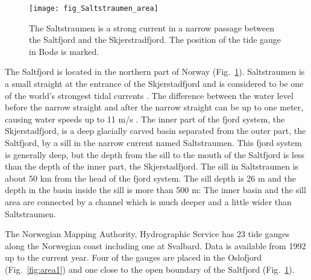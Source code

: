 \begin{figure}[!t]
\centering
\texttt{[image: fig\_Saltstraumen\_area]}
\caption{The Saltstraumen is a strong current in a narrow passage between the Saltfjord and the Skjerstradfjord. The position of the tide gauge in Bod{\o} is marked.}
\label{fig:area2}
\end{figure}

The Saltfjord is located in the northern part of Norway (Fig.~\ref{fig:area2}). Saltstraumen is a small straight at the entrance of the Skjerstadfjord and is considered to be one of the world's strongest tidal currents \cite[]{gjevik09}. The difference between the water level before the narrow straight and after the narrow straight can be up to one meter, causing water speeds up to 11 m/s \cite[]{eliassen01}.
The inner part of the fjord system, the Skjerstadfjord, is a deep glacially carved basin separated from the outer part, the Saltfjord, by a sill in the narrow current named Saltstraumen. This fjord system is generally deep, but the depth from the sill to the mouth of the Saltfjord is less than the depth of the inner part, the Skjerstadfjord. The sill in Saltstraumen is about 50 km from the head of the fjord system. The sill depth is 26 m and the depth in the basin inside the sill is more than 500 m: The inner basin and the sill area are connected by a channel which is much deeper and a little wider than Saltstraumen.

The Norwegian Mapping Authority, Hydrographic Service has 23 tide gauges along the Norwegian coast including one at Svalbard. Data is available from 1992 up to the current year. Four of the gauges are placed in the Oslofjord  (Fig.~\ref{fig:area1}) and one close to the open boundary of the Saltfjord (Fig.~\ref{fig:area2}).

